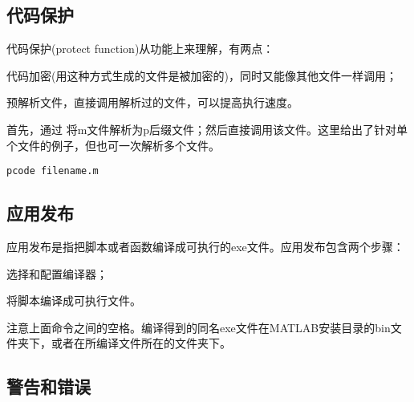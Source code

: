 




\subsection{代码保护}

代码保护(protect function)从功能上来理解，有两点：

\begindot
  \item 代码加密(用这种方式生成的文件是被加密的)，同时又能像其他文件一样调用；
  \item 预解析文件，直接调用解析过的文件，可以提高执行速度。
\myenddot

首先，通过  将m文件解析为p后缀文件；然后直接调用该文件。这里给出了针对单个文件的例子，但也可一次解析多个文件。

\vspace{-0.8cm}
\begin{lstlisting}[caption = 代码保护]
pcode filename.m
\end{lstlisting}






\subsection{应用发布}

应用发布是指把脚本或者函数编译成可执行的exe文件。应用发布包含两个步骤：

 \begindot
  \item {} 选择和配置编译器；
  \item {} 将脚本编译成可执行文件。
 \myenddot

注意上面命令之间的空格。编译得到的同名exe文件在MATLAB安装目录的bin文件夹下，或者在所编译文件所在的文件夹下。





\subsection{警告和错误}

